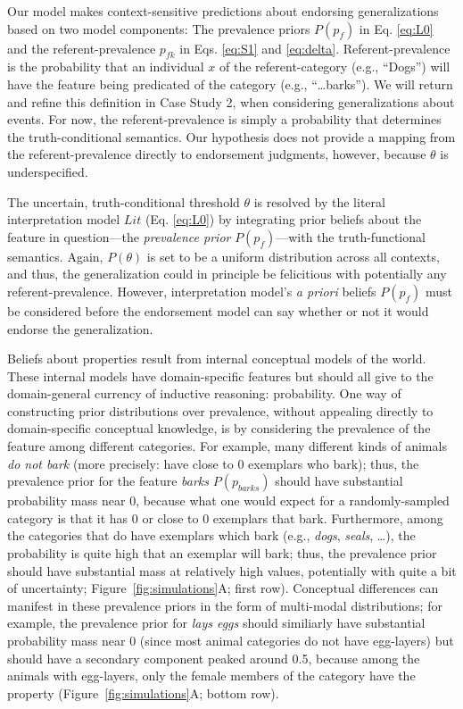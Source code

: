 \documentclass[english,floatsintext,man]{apa6}
\theoremstyle{definition}
\theoremstyle{definition}
\theoremstyle{definition}
\theoremstyle{remark}
\begin{document}
Our model makes context-sensitive predictions about endorsing
generalizations based on two model components: The prevalence priors
\(P(p_f)\) in Eq. \ref{eq:L0} and the referent-prevalence \(p_{fk}\) in
Eqs. \ref{eq:S1} and \ref{eq:delta}. Referent-prevalence is the
probability that an individual \(x\) of the referent-category (e.g.,
\enquote{Dogs}) will have the feature being predicated of the category
(e.g., \enquote{\ldots{}barks}). We will return and refine this
definition in Case Study 2, when considering generalizations about
events. For now, the referent-prevalence is simply a probability that
determines the truth-conditional semantics. Our hypothesis does not
provide a mapping from the referent-prevalence directly to endorsement
judgments, however, because \(\theta\) is underspecified.

The uncertain, truth-conditional threshold \(\theta\) is resolved by the
literal interpretation model \(Lit\) (Eq. \ref{eq:L0}) by integrating
prior beliefs about the feature in question---the \emph{prevalence
prior} \(P(p_f)\)---with the truth-functional semantics. Again,
\(P(\theta)\) is set to be a uniform distribution across all contexts,
and thus, the generalization could in principle be felicitious with
potentially any referent-prevalence. However, interpretation model's
\emph{a priori} beliefs \(P(p_f)\) must be considered before the
endorsement model can say whether or not it would endorse the
generalization.

Beliefs about properties result from internal conceptual models of the
world. These internal models have domain-specific features but should
all give to the domain-general currency of inductive reasoning:
probability. One way of constructing prior distributions over
prevalence, without appealing directly to domain-specific conceptual
knowledge, is by considering the prevalence of the feature among
different categories. For example, many different kinds of animals
\emph{do not bark} (more precisely: have close to 0 exemplars who bark);
thus, the prevalence prior for the feature \emph{barks} \(P(p_{barks})\)
should have substantial probability mass near 0, because what one would
expect for a randomly-sampled category is that it has 0 or close to 0
exemplars that bark. Furthermore, among the categories that do have
exemplars which bark (e.g., \emph{dogs}, \emph{seals}, \ldots{}), the
probability is quite high that an exemplar will bark; thus, the
prevalence prior should have substantial mass at relatively high values,
potentially with quite a bit of uncertainty;
Figure~\ref{fig:simulations}A; first row). Conceptual differences can
manifest in these prevalence priors in the form of multi-modal
distributions; for example, the prevalence prior for \emph{lays eggs}
should similiarly have substantial probability mass near 0 (since most
animal categories do not have egg-layers) but should have a secondary
component peaked around 0.5, because among the animals with egg-layers,
only the female members of the category have the property
(Figure~\ref{fig:simulations}A; bottom row).
\end{document}
